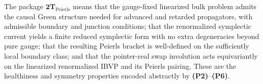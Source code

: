 \begin{remark}
The package \(\mathbf{2T}_{\mathrm{Peierls}}\) means that the gauge-fixed
linearized bulk problem admits the causal Green
structure needed for advanced and retarded propagators, with admissible
boundary and junction conditions; that the renormalized symplectic current
yields a finite reduced symplectic form with no extra degeneracies beyond pure
gauge; that the resulting Peierls bracket is well-defined on the
sufficiently local boundary class; and that the pointer-real swap involution
acts equivariantly on the linearized renormalized IBVP and its Peierls pairing.
These are the healthiness and symmetry properties encoded abstractly by
\textbf{(P2)}--\textbf{(P6)}.
\end{remark}

